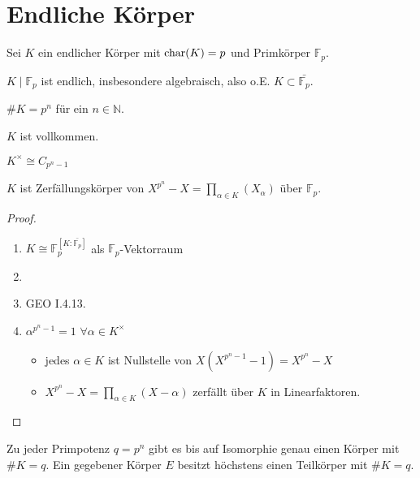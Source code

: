 \section{Endliche Körper}

Sei $K$ ein endlicher Körper mit $\operatorname{char}(K) = p$ und Primkörper $\mathbb F_p$.

\begin{remark}
	$K\mid \mathbb F_p$ ist endlich, insbesondere algebraisch, also o.E. $K\subset\bar{\mathbb F_p}$.
\end{remark}

\begin{lemma}
	\begin{lemmaenum}
		\item $\# K = p^n$ für ein $n\in\mathbb N$.
		\item $K$ ist vollkommen.
		\item {} $K^\times\cong C_{p^n-1}$
		\item {} $K$ ist Zerfällungskörper von $X^{p^n}- X = \prod_{\alpha\in K}(X_\alpha)$ über $\mathbb F_p$.
	\end{lemmaenum}
\end{lemma}

\begin{proof}
	\leavevmode
	\begin{enumerate}[topsep=-6pt,label={(\arabic*)}]
		\item $K\cong \mathbb F_p^{[K:\bar{\mathbb F_p}]}$ als $\mathbb F_p$-Vektorraum
		\item {}
		\item GEO I.4.13.
		\item $\alpha^{p^n-1} = 1$ $\forall \alpha\in K^\times$ \begin{itemize}[label={$\Rightarrow$},topsep=0pt]
			\item jedes $\alpha\in K$ ist Nullstelle von $X(X^{p^n-1}-1)= X^{p^n}-X$
			\item $X^{p^n}- X =\prod_{\alpha\in K}(X-\alpha)$ zerfällt über $K$ in Linearfaktoren.
		\end{itemize}
	\end{enumerate}
\end{proof}

\begin{proposition}
	Zu jeder Primpotenz $q=p^n$ gibt es bis auf Isomorphie genau einen Körper mit $\# K = q$. Ein gegebener Körper $E$ besitzt höchstens einen Teilkörper mit $\# K = q$.
\end{proposition}

